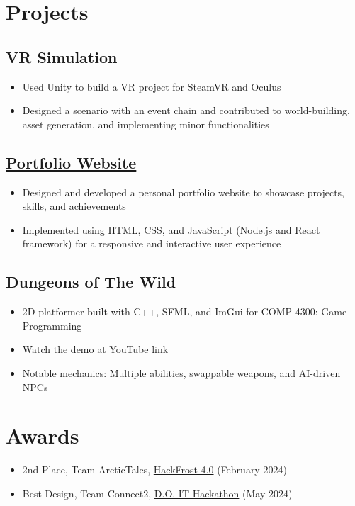 \documentclass[10pt]{article}
\begin{document}
\section{Projects}

\subsection{VR Simulation \hfill }
\begin{itemize}
    \item Used Unity to build a VR project for SteamVR and Oculus
    \item Designed a scenario with an event chain and contributed to world-building, asset generation, and implementing minor functionalities
\end{itemize}

\subsection{\href{https://arunav.netlify.app}{Portfolio Website} \hfill }
\begin{itemize}
    \item Designed and developed a personal portfolio website to showcase projects, skills, and achievements
    \item Implemented using HTML, CSS, and JavaScript (Node.js and React framework) for a responsive and interactive user experience
\end{itemize}

\subsection{Dungeons of The Wild \hfill }
\begin{itemize}
    \item 2D platformer built with C++, SFML, and ImGui for COMP 4300: Game Programming
    \item Watch the demo at \href{https://youtu.be/BavucS3_W5g}{YouTube link}
    \item Notable mechanics: Multiple abilities, swappable weapons, and AI-driven NPCs
\end{itemize}

\section{Awards}

\begin{itemize}
    \item 2nd Place, Team ArcticTales, \href{https://hackfrostnl.ca}{HackFrost 4.0} (February 2024)
    \item Best Design, Team Connect2, \href{https://ecumene.github.io/dontoverthinkit/}{D.O. IT Hackathon} (May 2024)
\end{itemize}
\end{document}
